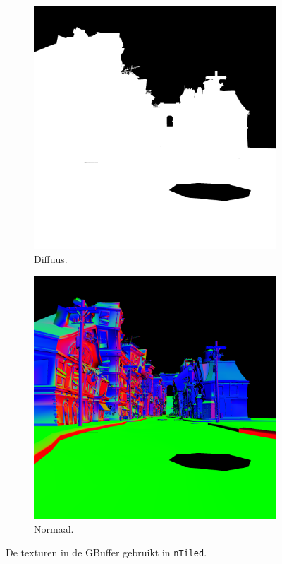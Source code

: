 \begin{figure}
  \begin{subfigure}[b]{.49\textwidth}
    \centering
    \includegraphics[width=\textwidth]{./img/raw/fds-gbuffer-ntiled/diffuus.png}
    \caption{Diffuus.}
    \label{fig:fds-gbuffer-ntiled:diffuse}
  \end{subfigure} %
  \begin{subfigure}[b]{.49\textwidth}
    \centering
    \includegraphics[width=\textwidth]{./img/raw/fds-gbuffer-ntiled/normal.png}
    \caption{Normaal.}
    \label{fig:fds-gbuffer-ntiled:normal}
  \end{subfigure}
  \caption{De texturen in de GBuffer gebruikt in \texttt{nTiled}.}
  \label{fig:fds-gbuffer-nTiled}
\end{figure}

